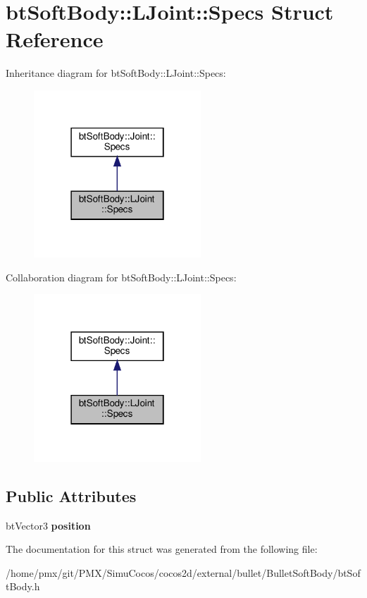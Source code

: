 \hypertarget{structbtSoftBody_1_1LJoint_1_1Specs}{}\section{bt\+Soft\+Body\+:\+:L\+Joint\+:\+:Specs Struct Reference}
\label{structbtSoftBody_1_1LJoint_1_1Specs}


Inheritance diagram for bt\+Soft\+Body\+:\+:L\+Joint\+:\+:Specs\+:
\nopagebreak
\begin{figure}[H]
\begin{center}
\leavevmode
\includegraphics[width=178pt]{structbtSoftBody_1_1LJoint_1_1Specs__inherit__graph}
\end{center}
\end{figure}


Collaboration diagram for bt\+Soft\+Body\+:\+:L\+Joint\+:\+:Specs\+:
\nopagebreak
\begin{figure}[H]
\begin{center}
\leavevmode
\includegraphics[width=178pt]{structbtSoftBody_1_1LJoint_1_1Specs__coll__graph}
\end{center}
\end{figure}
\subsection*{Public Attributes}
\begin{DoxyCompactItemize}
\item 
\mbox{\label{structbtSoftBody_1_1LJoint_1_1Specs_abe696eb6c83d211fb066bf42709550a7}} 
bt\+Vector3 {\bfseries position}
\end{DoxyCompactItemize}


The documentation for this struct was generated from the following file\+:\begin{DoxyCompactItemize}
\item 
/home/pmx/git/\+P\+M\+X/\+Simu\+Cocos/cocos2d/external/bullet/\+Bullet\+Soft\+Body/bt\+Soft\+Body.\+h\end{DoxyCompactItemize}
